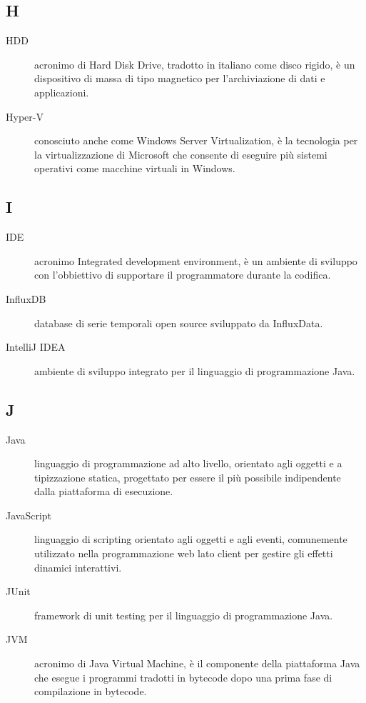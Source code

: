 \documentclass[../../../manuale.sviluppatore.tex]{subfiles}
\begin{document}
\subsection{H}

\begin{description}
  \item[HDD] acronimo di Hard Disk Drive, tradotto in italiano come disco rigido, è un dispositivo di massa di tipo magnetico per l'archiviazione di dati e applicazioni.
  \item[Hyper-V] conosciuto anche come Windows Server Virtualization, è la tecnologia per la virtualizzazione di Microsoft che consente di eseguire più sistemi operativi come macchine virtuali in Windows.
\end{description}

\subsection{I}

\begin{description}
    \item[IDE] acronimo Integrated development environment, è un ambiente di sviluppo con l'obbiettivo di supportare il programmatore durante la codifica.
    \item[InfluxDB] database di serie temporali open source sviluppato da InfluxData.
    \item[IntelliJ IDEA] ambiente di sviluppo integrato per il linguaggio di programmazione Java.
\end{description}

\subsection{J}

\begin{description}
    \item[Java] linguaggio di programmazione ad alto livello, orientato agli oggetti e a tipizzazione statica, progettato per essere il più possibile indipendente dalla piattaforma di esecuzione.
    \item[JavaScript] linguaggio di scripting orientato agli oggetti e agli eventi, comunemente utilizzato nella programmazione web lato client per gestire gli effetti dinamici interattivi.
    \item[JUnit] framework di unit testing per il linguaggio di programmazione Java.
    \item[JVM] acronimo di Java Virtual Machine, è il componente della piattaforma Java che esegue i programmi tradotti in bytecode dopo una prima fase di compilazione in bytecode.
\end{description}
\end{document}
